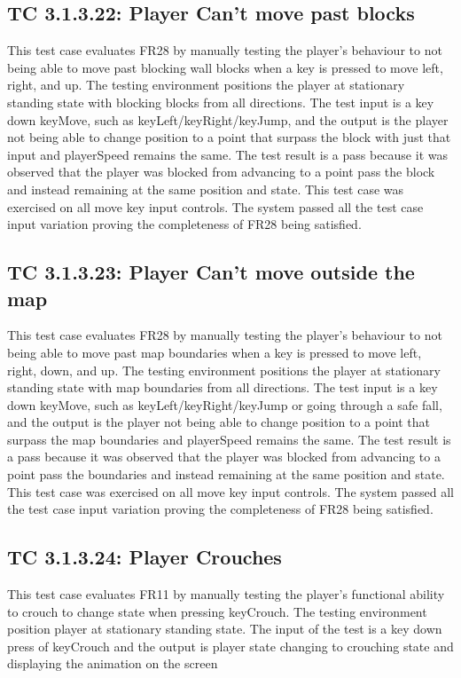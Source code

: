 \documentclass[12pt, titlepage]{article}
\begin{document}
\subsection*{TC 3.1.3.22: Player Can't move past blocks}
This test case evaluates FR28 by manually testing the player's behaviour to not being able to move past blocking wall blocks when a key is pressed to move left, right, and up. The testing environment positions the player at stationary standing state with blocking blocks from all directions. The test input is a key down keyMove, such as keyLeft/keyRight/keyJump, and the output is the player not being able to change position to a point that surpass the block with just that input and playerSpeed remains the same. The test result is a pass because it was observed that the player was blocked from advancing to a point pass the block and instead remaining at the same position and state. This test case was exercised on all move key input controls. The system passed all the test case input variation proving the completeness of FR28 being satisfied. 

\subsection*{TC 3.1.3.23: Player Can't move outside the map}
This test case evaluates FR28 by manually testing the player's behaviour to not being able to move past map boundaries when a key is pressed to move left, right, down, and up. The testing environment positions the player at stationary standing state with map boundaries from all directions. The test input is a key down keyMove, such as keyLeft/keyRight/keyJump or going through a safe fall, and the output is the player not being able to change position to a point that surpass the map boundaries and playerSpeed remains the same. The test result is a pass because it was observed that the player was blocked from advancing to a point pass the boundaries and instead remaining at the same position and state. This test case was exercised on all move key input controls. The system passed all the test case input variation proving the completeness of FR28 being satisfied.

\subsection*{TC 3.1.3.24: Player Crouches}
This test case evaluates FR11 by manually testing the player's functional ability to crouch to change state when pressing keyCrouch. The testing environment position player at stationary standing state. The input of the test is a key down press of keyCrouch and the output is player state changing to crouching state and displaying the animation on the screen 
\end{document}
